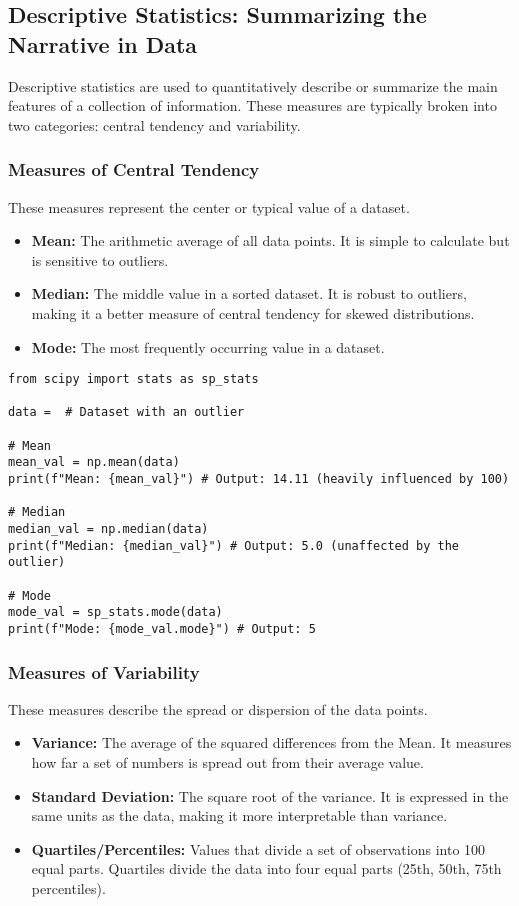 \documentclass[11pt,a4paper]{article}
\begin{document}
\subsection{Descriptive Statistics: Summarizing the Narrative in Data}

Descriptive statistics are used to quantitatively describe or summarize the main features of a collection of information. These measures are typically broken into two categories: central tendency and variability.

\subsubsection{Measures of Central Tendency}

These measures represent the center or typical value of a dataset.
\begin{itemize}
    \item \textbf{Mean:} The arithmetic average of all data points. It is simple to calculate but is sensitive to outliers.
    \item \textbf{Median:} The middle value in a sorted dataset. It is robust to outliers, making it a better measure of central tendency for skewed distributions.
    \item \textbf{Mode:} The most frequently occurring value in a dataset.
\end{itemize}

\begin{lstlisting}
from scipy import stats as sp_stats

data =  # Dataset with an outlier

# Mean
mean_val = np.mean(data)
print(f"Mean: {mean_val}") # Output: 14.11 (heavily influenced by 100)

# Median
median_val = np.median(data)
print(f"Median: {median_val}") # Output: 5.0 (unaffected by the outlier)

# Mode
mode_val = sp_stats.mode(data)
print(f"Mode: {mode_val.mode}") # Output: 5
\end{lstlisting}

\subsubsection{Measures of Variability}

These measures describe the spread or dispersion of the data points.
\begin{itemize}
    \item \textbf{Variance:} The average of the squared differences from the Mean. It measures how far a set of numbers is spread out from their average value.
    \item \textbf{Standard Deviation:} The square root of the variance. It is expressed in the same units as the data, making it more interpretable than variance.
    \item \textbf{Quartiles/Percentiles:} Values that divide a set of observations into 100 equal parts. Quartiles divide the data into four equal parts (25th, 50th, 75th percentiles).
\end{itemize}
\end{document}
